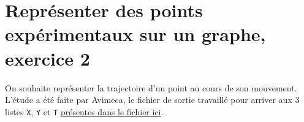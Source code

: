 \documentclass[11pt]{article}
\begin{document}
\newpage







\section{Représenter des points expérimentaux sur un graphe, exercice 2}





\bigskip


On souhaite représenter la trajectoire d'un point au cours de son mouvement. L'étude a été faite par Avimeca, le fichier de sortie travaillé pour arriver aux 3 listes \texttt{X}, \texttt{Y} et \texttt{T} \href{https://github.com/formationPythonPC-Juin/aides-formation/blob/master/exercice2-aide.py}{\underline{présentes dans le fichier ici}}.
\end{document}
